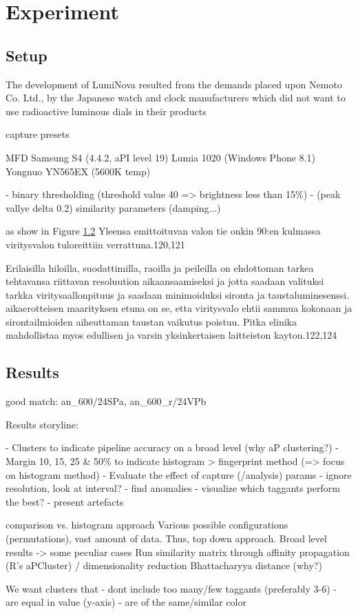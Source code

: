 \documentclass[thesis.tex]{subfiles}
\begin{document}
\chapter{Experiment}
\label{chapter:experiment}

\section{Setup}

The development of LumiNova resulted from the demands placed upon Nemoto  Co. Ltd.,  by the Japanese watch and clock manufacturers which did not want to use radioactive luminous dials in their products

capture presets

MFD
Samsung S4 (4.4.2, aPI level 19)
Lumia 1020 (Windows Phone 8.1)
Yongnuo YN565EX (5600K temp)

- binary thresholding (threshold value 40 => brightness less than 15\%)
- (peak vallye delta 0.2)
similarity parameters (damping...)

as show in Figure \ref{} Yleensa emittoituvan valon tie onkin 90:en kulmassa viritysvalon tuloreittiin verrattuna.120,121

Erilaisilla hiloilla, suodattimilla, raoilla ja peileilla on ehdottoman tarkea tehtavansa riittavan resoluution aikaansaamiseksi ja jotta saadaan valituksi tarkka viritysaallonpituus ja saadaan minimoiduksi sironta ja taustaluminesenssi. aikaerotteisen maarityksen etuna on se, etta viritysvalo ehtii sammua kokonaan ja sirontailmioiden aiheuttaman taustan vaikutus poistuu. Pitka elinika mahdollistaa myos edullisen ja varsin yksinkertaisen laitteiston kayton.122,124

\section{Results}

good match: an\_600/24SPa, an\_600\_r/24VPb

Results storyline:

- Clusters to indicate pipeline accuracy on a broad level (why aP clustering?)
- Margin 10, 15, 25 \& 50\% to indicate histogram > fingerprint method (=> focus on histogram method)
- Evaluate the effect of capture (/analysis) params
  - ignore resolution, look at interval?
  - find anomalies
  - visualize which taggants perform the best?
- present artefacts

comparison vs. histogram approach
Various possible configurations (permutations), vast amount of data. Thus, top down approach. Broad level results -> some peculiar cases
Run similarity matrix through affinity propagation (R's aPCluster) / dimensionality reduction
Bhattacharyya distance (why?)

We want clusters that
- dont include too many/few taggants (preferably 3-6)
- are equal in value (y-axis)
- are of the same/similar color
\end{document}
